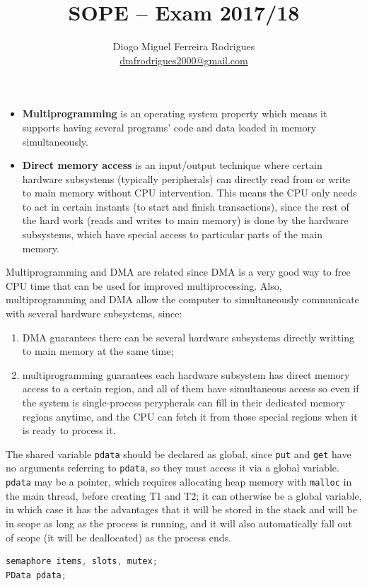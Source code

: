 \documentclass{sope}
\title{SOPE -- Exam 2017/18}
\author{Diogo Miguel Ferreira Rodrigues \\ \href{mailto:dmfrodrigues2000@gmail.com}{dmfrodrigues2000@gmail.com}}
\begin{document}
\setcounter{chapter}{17}
{
\renewcommand{\thesubsection}{\thesection\alph{subsection}}
\begin{itemize}
    \item \textbf{Multiprogramming} is an operating system property which means it supports having several programs' code and data loaded in memory simultaneously.
    \item \textbf{Direct memory access} is an input/output technique where certain hardware subsystems (typically peripherals) can directly read from or write to main memory without CPU intervention. This means the CPU only needs to act in certain instants (to start and finish transactions), since the rest of the hard work (reads and writes to main memory) is done by the hardware subsystems, which have special access to particular parts of the main memory.
\end{itemize}
Multiprogramming and DMA are related since DMA is a very good way to free CPU time that can be used for improved multiprocessing. Also, multiprogramming and DMA allow the computer to simultaneously communicate with several hardware subsystems, since:
\begin{enumerate}
    \item DMA guarantees there can be several hardware subsystems directly writting to main memory at the same time;
    \item multiprogramming guarantees each hardware subsystem has direct memory access to a certain region, and all of them have simultaneous access so even if the system is single-process perypherals can fill in their dedicated memory regions anytime, and the CPU can fetch it from those special regions when it is ready to process it.
\end{enumerate}

The shared variable \texttt{pdata} should be declared as global, since \texttt{put} and \texttt{get} have no arguments referring to \texttt{pdata}, so they must access it via a global variable. \texttt{pdata} may be a pointer, which requires allocating heap memory with \texttt{malloc} in the main thread, before creating T1 and T2; it can otherwise be a global variable, in which case it has the advantages that it will be stored in the stack and will be in scope as long as the process is running, and it will also automatically fall out of scope (it will be deallocated) as the process ends. \par
\begin{lstlisting}[language=C]
semaphore items, slots, mutex;
PData pdata;


\end{lstlisting}}
\end{document}
